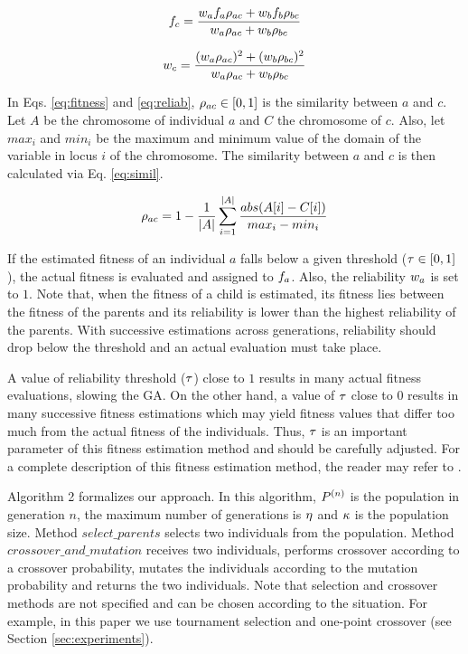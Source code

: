 \documentclass[a4paper]{sbgames}
\begin{document}
\begin{equation}
\label{eq:fitness}
f_{c} = \frac{w_{a}f_{a}\rho_{ac} + w_{b}f_{b}\rho_{bc}}{w_{a}\rho_{ac} + w_{b}\rho_{bc}}
\end{equation}

\begin{equation}
\label{eq:reliab}
w_{c} = \frac{(w_{a}\rho_{ac})^2 + (w_{b}\rho_{bc})^2}{w_{a}\rho_{ac} + w_{b}\rho_{bc}}
\end{equation}

In Eqs. \ref{eq:fitness} and \ref{eq:reliab}, $\rho_{ac} \in [0,1]$ is the similarity between $a$ and $c$. Let $A$ be the chromosome of individual $a$ and $C$ the chromosome of $c$. Also, let $max_i$ and $min_i$ be the maximum and minimum value of the domain of the variable in locus $i$ of the chromosome. The similarity between $a$ and $c$ is then calculated via Eq. \ref{eq:simil}.

\begin{equation}
\label{eq:simil}
\rho_{ac} = 1 - \frac{1}{|A|} \sum_{i = 1}^{|A|} \frac{abs(A[i] - C[i])}{max_i - min_i}
\end{equation}

If the estimated fitness of an individual $a$ falls below a given threshold ($\tau \in [0,1]$), the actual fitness is evaluated and assigned to $f_{a}$. Also, the reliability $w_{a}$ is set to $1$. Note that, when the fitness of a child is estimated, its fitness lies between the fitness of the parents and its reliability is lower than the highest reliability of the parents. With successive estimations across generations, reliability should drop below the threshold and an actual evaluation must take place.


A value of reliability threshold ($\tau$) close to $1$ results in many actual fitness evaluations, slowing the GA. On the other hand, a value of $\tau$ close to $0$ results in many successive fitness estimations which may yield fitness values that differ too  much from the actual fitness of the individuals. Thus, $\tau$ is an important parameter of this fitness estimation method and should be carefully adjusted. For a complete description of this fitness estimation method, the reader may refer to \cite{Salami&Hendtlass2003}.

Algorithm 2 formalizes our approach. In this algorithm, $P^{(n)}$ is the population in generation $n$, the maximum number of generations is $\eta$ and $\kappa$ is the population size. Method $select\_parents$ selects two individuals from the population. Method $crossover\_and\_mutation$ receives two individuals, performs crossover according to a crossover probability, mutates the individuals according to the mutation probability and returns the two individuals. Note that selection and crossover methods are not specified and can be chosen according to the situation. For example, in this paper we use tournament selection and one-point crossover (see Section \ref{sec:experiments}).
\end{document}

